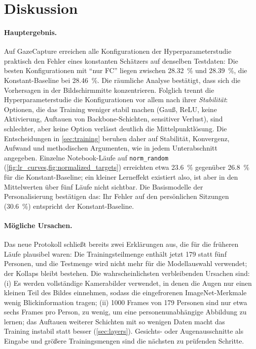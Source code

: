 \documentclass[
  11pt,
  a4paper,
  oneside,
  DIV=12,
  BCOR=8mm,
  parskip=half,
  headings=normal,
  bibliography=totoc,
  listof=totoc
]{scrreprt}
\newcommand{\code}[1]{\texttt{#1}}
\begin{document}
\section{Diskussion}
\label{sec:discussion}

\paragraph{Hauptergebnis.}
Auf GazeCapture erreichen alle Konfigurationen der Hyperparameterstudie
praktisch den Fehler eines konstanten Schätzers auf denselben Testdaten: Die
besten Konfigurationen mit \enquote{nur FC} liegen zwischen
\SI{28,32}{\percent} und \SI{28,39}{\percent}, die Konstant-Baseline bei
\SI{28,46}{\percent}. Die räumliche Analyse bestätigt, dass sich die
Vorhersagen in der Bildschirmmitte konzentrieren. Folglich trennt die
Hyperparameterstudie die Konfigurationen vor allem nach ihrer
\emph{Stabilität}: Optionen, die das Training weniger stabil machen (Gauß,
ReLU, keine Aktivierung, Auftauen von Backbone-Schichten, sensitiver Verlust),
sind schlechter, aber keine Option verlässt deutlich die Mittelpunktlösung.
Die Entscheidungen in \cref{sec:training} beruhen daher auf Stabilität,
Konvergenz, Aufwand und methodischen Argumenten, wie in jedem Unterabschnitt
angegeben. Einzelne Notebook-Läufe auf \code{norm\_random}
(\cref{fig:lr_curves,fig:normalized_targets}) erreichten etwa
\SI{23,6}{\percent} gegenüber \SI{26,8}{\percent} für die Konstant-Baseline;
ein kleiner Lerneffekt existiert also, ist aber in den Mittelwerten über fünf
Läufe nicht sichtbar. Die Basismodelle der Personalisierung bestätigen das:
Ihr Fehler auf den persönlichen Sitzungen (\SI{30,6}{\percent}) entspricht
der Konstant-Baseline.

\paragraph{Mögliche Ursachen.} Das neue Protokoll schließt bereits zwei
Erklärungen aus, die für die früheren Läufe plausibel waren: Die
Trainingsteilmenge enthält jetzt 179 statt fünf Personen, und die Testmenge
wird nicht mehr für die Modellauswahl verwendet; der Kollaps bleibt bestehen.
Die wahrscheinlichsten verbleibenden Ursachen sind:
(i) Es werden vollständige Kamerabilder verwendet, in denen die Augen nur
einen kleinen Teil des Bildes einnehmen, sodass die eingefrorenen
ImageNet-Merkmale wenig Blickinformation tragen;
(ii) \num{1000} Frames von 179 Personen sind nur etwa sechs Frames pro Person,
zu wenig, um eine personenunabhängige Abbildung zu lernen; das Auftauen
weiterer Schichten mit so wenigen Daten macht das Training instabil statt
besser (\cref{sec:layers}).
Gesichts- oder Augenausschnitte als Eingabe und größere Trainingsmengen sind
die nächsten zu prüfenden Schritte.
\end{document}

